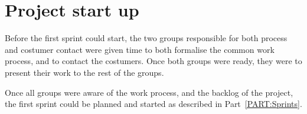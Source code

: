 \section{Project start up}
Before the first sprint could start, the two groups responsible for both process and costumer contact were given time to both formalise the common work process, and to contact the costumers.
Once both groups were ready, they were to present their work to the rest of the groups.

Once all groups were aware of the work process, and the backlog of the project, the first sprint could be planned and started as described in Part~\ref{PART:Sprints}.
